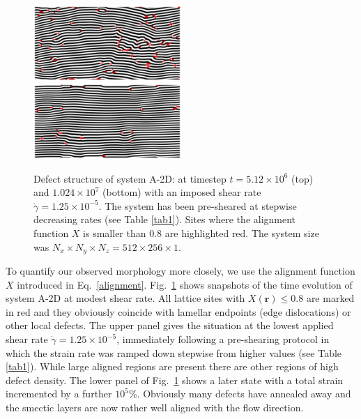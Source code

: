 \documentclass[8.5pt,twoside,twocolumn]{article}
\newcommand{\e}[1]{\times10^{#1}}
\begin{document}
\begin{figure}[htp]
\centering
\includegraphics[angle=0,width=0.5\textwidth]{phi_defects_run774_5120.jpg}
\includegraphics[angle=0,width=0.5\textwidth]{phi_defects_run774_10240.jpg}
\caption{Defect structure of system A-2D: at timestep $t=5.12\e{6}$ (top) and $1.024\e{7}$ (bottom) with an imposed shear rate $\dot{\gamma}=1.25\times10^{-5}$. The system has been pre-sheared at stepwise decreasing rates (see Table \ref{tab1}). Sites where the alignment function $X$ is smaller than $0.8$ are highlighted red. The system size was $N_x\times N_y \times N_z=512\times 256 \times 1$.}
\label{fig3}
\end{figure}

To quantify our observed morphology more closely, we use the alignment function $X$ introduced in Eq.~\ref{alignment}.
Fig.~\ref{fig3} shows snapshots of the time evolution of system A-2D at modest shear rate.
All lattice sites with $X({\mathbf r})\le0.8$ are marked in red and they obviously coincide with lamellar endpoints (edge dislocations) or other local defects.
The upper panel gives the situation at the lowest applied shear rate $\dot{\gamma}=1.25\e{-5}$, immediately following a pre-shearing protocol in which the strain rate was ramped down stepwise from higher values (see Table \ref{tab1}). While large aligned regions are present there are other regions of high defect density.
The lower panel of Fig.~\ref{fig3} shows a later state with a total strain incremented by a further $10^{5}\%$. 
Obviously many defects have annealed away and the smectic layers are now rather well aligned with the flow direction.
\end{document}
